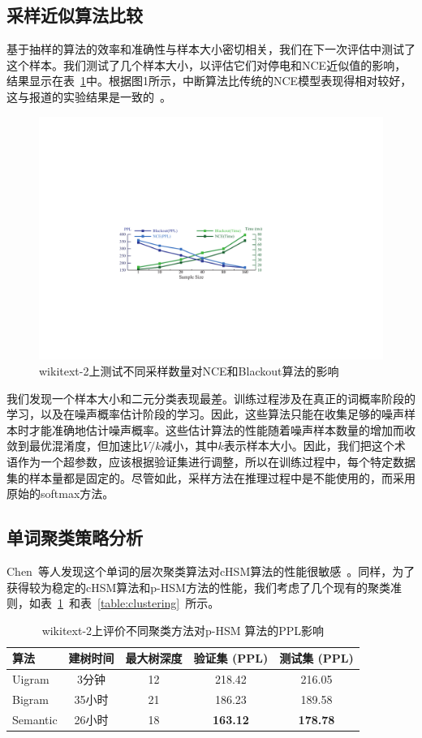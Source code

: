 \subsection{采样近似算法比较}

基于抽样的算法的效率和准确性与样本大小密切相关，我们在下一次评估中测试了这个样本。我们测试了几个样本大小，以评估它们对停电和NCE近似值的影响，结果显示在表~\ref{fig:blackout_nce}中。根据图1所示，中断算法比传统的NCE模型表现得相对较好，这与报道的实验结果是一致的~\cite{DBLP:journals/iclr/JiVSAD15}。

\begin{figure}[!t]
  \centering
  \includegraphics[width=.85\columnwidth]{./figures/nce_blackout.pdf}
  \caption{wikitext-2上测试不同采样数量对NCE和Blackout算法的影响}\label{fig:blackout_nce}
\end{figure}

我们发现一个样本大小和二元分类表现最差。训练过程涉及在真正的词概率阶段的学习，以及在噪声概率估计阶段的学习。因此，这些算法只能在收集足够的噪声样本时才能准确地估计噪声概率。这些估计算法的性能随着噪声样本数量的增加而收敛到最优混淆度，但加速比$ V / k $减小，其中$ k $表示样本大小。因此，我们把这个术语作为一个超参数，应该根据验证集进行调整，所以在训练过程中，每个特定数据集的样本量都是固定的。尽管如此，采样方法在推理过程中是不能使用的，而采用原始的softmax方法。



\subsection{单词聚类策略分析}
Chen~等人发现这个单词的层次聚类算法对cHSM算法的性能很敏感~。同样，为了获得较为稳定的cHSM算法和p-HSM方法的性能，我们考虑了几个现有的聚类准则，如表~\ref{table:p-thsm}~和表~\ref{table:clustering}~所示。
\begin{table}[!t]
  \centering
   \caption{wikitext-2上评价不同聚类方法对p-HSM 算法的PPL影响\label{table:p-thsm}}
  \begin{tabular}{lcccc} \toprule
  算法  &建树时间&最大树深度 &验证集 (PPL) & 测试集 (PPL)  \\ \midrule
  Uigram  &3分钟&12 &218.42& 216.05     \\
  Bigram  &35小时&21& 186.23& 189.58\\
  Semantic &26小时 &18& \textbf{163.12} & \textbf{178.78}\\
\bottomrule
  \end{tabular}
\end{table}

